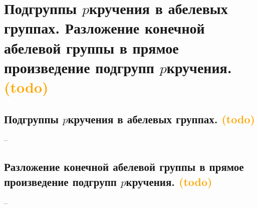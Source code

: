 \section{Подгруппы \texorpdfstring{$p$}-кручения в абелевых группах. Разложение конечной абелевой группы в прямое произведение подгрупп \texorpdfstring{$p$}-кручения. \textcolor{orange}{(todo)}}

\subsection{Подгруппы \texorpdfstring{$p$}-кручения в абелевых группах. \textcolor{orange}{(todo)}}
--
\subsection{Разложение конечной абелевой группы в прямое произведение подгрупп \texorpdfstring{$p$}-кручения. \textcolor{orange}{(todo)}}
--